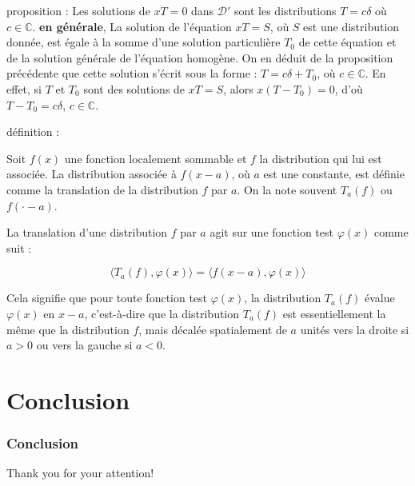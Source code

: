 \documentclass{beamer}
\begin{document}
\begin{frame}
\begin{block}{proposition :}
Les solutions de \( xT = 0 \) dans \( \mathcal{D}' \) sont les distributions \( T = c\delta \) où \( c \in \mathbb{C} \).
\textbf{en générale}, La solution de l'équation \( xT = S \), où \( S \) est une distribution donnée, est égale à la somme d'une solution particulière \( T_0 \) de cette équation et de la solution générale de l'équation homogène. On en déduit de la proposition précédente que cette solution s'écrit sous la forme : \( T = c \delta + T_0 \), où \( c \in \mathbb{C} \). En effet, si \( T \) et \( T_0 \) sont des solutions de \( xT = S \), alors \( x(T-T_0) = 0 \), d'où \( T-T_0 = c\delta \), \( c \in \mathbb{C} \).

\end{block}

\end{frame}
\begin{frame}
\begin{block}{définition :}

Soit \( f(x) \) une fonction localement sommable et \( f \) la distribution qui lui est associée. La distribution associée à \( f(x - a) \), où \( a \) est une constante, est définie comme la translation de la distribution \( f \) par \( a \). On la note souvent \( T_a(f) \) ou \( f(\cdot - a) \).

La translation d'une distribution \( f \) par \( a \) agit sur une fonction test \( \varphi(x) \) comme suit :

\[ \langle T_a(f), \varphi(x) \rangle = \langle f(x - a), \varphi(x) \rangle \]

Cela signifie que pour toute fonction test \( \varphi(x) \), la distribution \( T_a(f) \) évalue \( \varphi(x) \) en \( x - a \), c'est-à-dire que la distribution \( T_a(f) \) est essentiellement la même que la distribution \( f \), mais décalée spatialement de \( a \) unités vers la droite si \( a > 0 \) ou vers la gauche si \( a < 0 \).

\end{block}


\end{frame}

\section{Conclusion}
\begin{frame}
\frametitle{Conclusion}
Thank you for your attention!
\end{frame}
\end{document}
